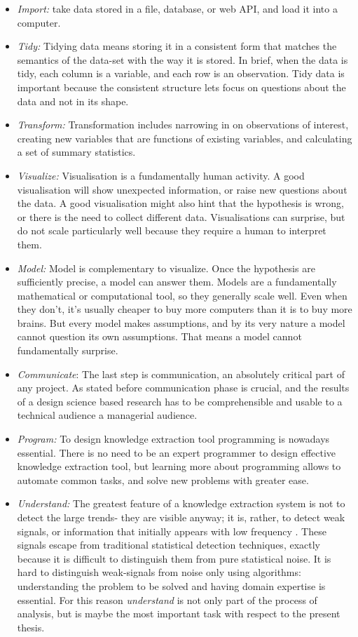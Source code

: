 \documentclass[b5paper,]{book}
\theoremstyle{definition}
\theoremstyle{definition}
\theoremstyle{definition}
\theoremstyle{remark}
\begin{document}
\begin{itemize}
\item
  \emph{Import:} take data stored in a file, database, or web API, and
  load it into a computer.
\item
  \emph{Tidy:} Tidying data means storing it in a consistent form that
  matches the semantics of the data-set with the way it is stored. In
  brief, when the data is tidy, each column is a variable, and each row
  is an observation. Tidy data is important because the consistent
  structure lets focus on questions about the data and not in its shape.
\item
  \emph{Transform:} Transformation includes narrowing in on observations
  of interest, creating new variables that are functions of existing
  variables, and calculating a set of summary statistics.
\item
  \emph{Visualize:} Visualisation is a fundamentally human activity. A
  good visualisation will show unexpected information, or raise new
  questions about the data. A good visualisation might also hint that
  the hypothesis is wrong, or there is the need to collect different
  data. Visualisations can surprise, but do not scale particularly well
  because they require a human to interpret them.
\item
  \emph{Model:} Model is complementary to visualize. Once the hypothesis
  are sufficiently precise, a model can answer them. Models are a
  fundamentally mathematical or computational tool, so they generally
  scale well. Even when they don't, it's usually cheaper to buy more
  computers than it is to buy more brains. But every model makes
  assumptions, and by its very nature a model cannot question its own
  assumptions. That means a model cannot fundamentally surprise.
\item
  \emph{Communicate}: The last step is communication, an absolutely
  critical part of any project. As stated before communication phase is
  crucial, and the results of a design science based research has to be
  comprehensible and usable to a technical audience a managerial
  audience.
\item
  \emph{Program:} To design knowledge extraction tool programming is
  nowadays essential. There is no need to be an expert programmer to
  design effective knowledge extraction tool, but learning more about
  programming allows to automate common tasks, and solve new problems
  with greater ease.
\item
  \emph{Understand:} The greatest feature of a knowledge extraction
  system is not to detect the large trends- they are visible anyway; it
  is, rather, to detect weak signals, or information that initially
  appears with low frequency \citep{apreda2016functional}. These signals
  escape from traditional statistical detection techniques, exactly
  because it is difficult to distinguish them from pure statistical
  noise. It is hard to distinguish weak-signals from noise only using
  algorithms: understanding the problem to be solved and having domain
  expertise is essential. For this reason \emph{understand} is not only
  part of the process of analysis, but is maybe the most important task
  with respect to the present thesis.
\end{itemize}
\end{document}

